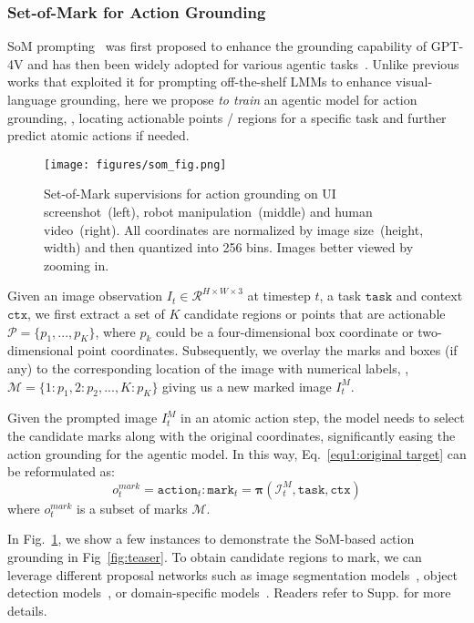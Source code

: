 \subsubsection{Set-of-Mark for Action Grounding}
\label{sec:som}
SoM prompting~\cite{yang2023set} was first proposed to enhance the grounding capability of GPT-4V and has then been widely adopted for various agentic tasks~\cite{liu2024moka,nasiriany2024pivot,yan2023gpt,huang2024copa,cheng2024spatialrgpt}. Unlike previous works that exploited it for prompting off-the-shelf LMMs to enhance visual-language grounding, here we propose \textit{to train} an agentic model for action grounding, \ie, locating actionable points / regions for a specific task and further predict atomic actions if needed.

\begin{figure}
    \centering
    \texttt{[image: figures/som\_fig.png]}
    \caption{Set-of-Mark supervisions for action grounding on UI screenshot~(left), robot manipulation~(middle) and human video~(right). All coordinates are normalized by image size~(height, width) and then quantized into 256 bins. Images better viewed by zooming in.}
    \label{fig:som_illustration}
\end{figure}
Given an image observation $I_t\in \mathcal{R}^{H \times W \times 3}$ at timestep $t$, a task $\texttt{task}$ and context $\texttt{ctx}$, we first extract a set of $K$ candidate regions or points that are actionable $\mathcal{P} = \{p_1,...,p_K\}$, where $p_k$ could be a four-dimensional box coordinate or two-dimensional point coordinates. Subsequently, we overlay the marks and boxes (if any) to the corresponding location of the image with numerical labels, \ie, $\mathcal{M} = \{1:p_1,2:p_2,...,K:p_K\}$ giving us a new marked image $I_t^{M}$.

Given the prompted image $I_t^{M}$ in an atomic action step, the model needs to select the candidate marks along with the original coordinates, significantly easing the action grounding for the agentic model. In this way, Eq.~\eqref{equ1:original target} can be reformulated as:
\begin{equation}
    {o}_t^{mark} = \texttt{action}_t:\texttt{mark}_t = \bm{\pi}(\mathcal{I}_t^{M}, \texttt{task}, \texttt{ctx})
    \label{equ2:reformulate with marker}
\end{equation}
where ${o}_t^{mark}$ is a subset of marks $\mathcal{M}$.

In Fig.~\ref{fig:som_illustration}, we show a few instances to demonstrate the SoM-based action grounding in Fig~\ref{fig:teaser}. 
To obtain candidate regions to mark, we can leverage different proposal networks such as image segmentation models~\cite{zou2023segment,kirillov2023segment}, object detection models~\cite{liu2023grounding,li2021grounded}, or domain-specific models~\cite{lu2024omniparser}. Readers refer to Supp. for more details.

